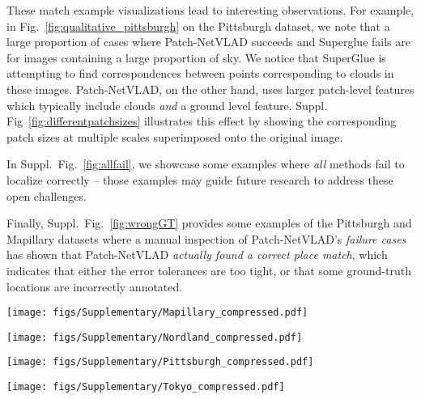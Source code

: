 These match example visualizations lead to interesting observations. For example, in Fig.~\ref{fig:qualitative_pittsburgh} on the Pittsburgh dataset, we note that a large proportion of cases where Patch-NetVLAD succeeds and Superglue fails are for images containing a large proportion of sky. We notice that SuperGlue is attempting to find correspondences between points corresponding to clouds in these images. Patch-NetVLAD, on the other hand, uses larger patch-level features which typically include clouds \textit{and} a ground level feature. Suppl. Fig~\ref{fig:differentpatchsizes} illustrates this effect by showing the corresponding patch sizes at multiple scales superimposed onto the original image.

In Suppl.~Fig.~\ref{fig:allfail}, we showcase some examples where \emph{all} methods fail to localize correctly -- those examples may guide future research to address these open challenges.

Finally, Suppl.~Fig.~\ref{fig:wrongGT} provides some examples of the Pittsburgh and Mapillary datasets where a manual inspection of Patch-NetVLAD's \emph{failure cases} has shown that Patch-NetVLAD \emph{actually found a correct place match}, which indicates that either the error tolerances are too tight, or that some ground-truth locations are incorrectly annotated.

\begin{figure*}[t!]
    \centering
    \texttt{[image: figs/Supplementary/Mapillary\_compressed.pdf]}
    \caption{\textbf{Feature correspondences for the Mapillary dataset. 
}}
    \label{fig:qualitative_mapillary}
\end{figure*}

\begin{figure*}[t!]
    \centering
    \texttt{[image: figs/Supplementary/Nordland\_compressed.pdf]}
    \caption{\textbf{Feature correspondences for the Nordland dataset.}}
    \label{fig:qualitative_nordland}
\end{figure*}

\begin{figure*}[t!]
    \centering
    \texttt{[image: figs/Supplementary/Pittsburgh\_compressed.pdf]}
    \caption{\textbf{Feature correspondences for the Pittsburgh dataset.}}
    \label{fig:qualitative_pittsburgh}
\end{figure*}

\begin{figure*}[t!]
    \centering
    \texttt{[image: figs/Supplementary/Tokyo\_compressed.pdf]}
    \caption{\textbf{Feature correspondences for the Tokyo 24/7 dataset.}}
    \label{fig:qualitative_tokyo}
\end{figure*}

